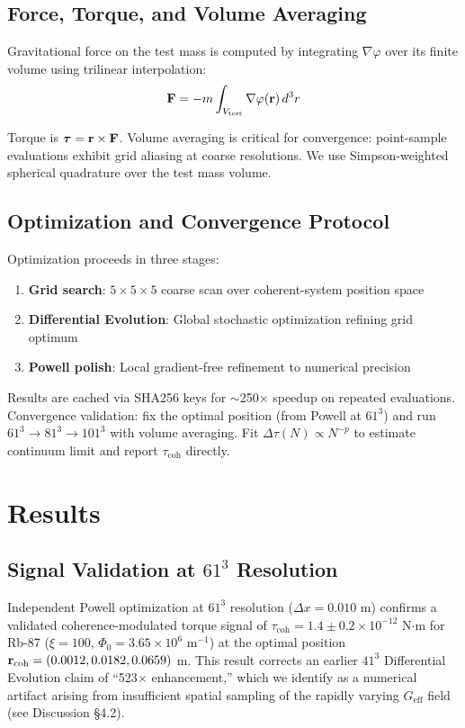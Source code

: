 \documentclass[10pt,twocolumn]{article}
\begin{document}
\subsection{Force, Torque, and Volume Averaging}

Gravitational force on the test mass is computed by integrating $\nabla\varphi$ over its finite volume using trilinear interpolation:
\begin{equation}
{\bf F} = -m \int_{V_{\text{test}}} \nabla\varphi({\bf r}) \, d^3r
\end{equation}

Torque is $\boldsymbol{\tau} = {\bf r} \times {\bf F}$. Volume averaging is critical for convergence: point-sample evaluations exhibit grid aliasing at coarse resolutions. We use Simpson-weighted spherical quadrature over the test mass volume.

\subsection{Optimization and Convergence Protocol}

Optimization proceeds in three stages:
\begin{enumerate}
\item \textbf{Grid search}: $5 \times 5 \times 5$ coarse scan over coherent-system position space
\item \textbf{Differential Evolution}: Global stochastic optimization refining grid optimum
\item \textbf{Powell polish}: Local gradient-free refinement to numerical precision
\end{enumerate}

Results are cached via SHA256 keys for $\sim$250$\times$ speedup on repeated evaluations. Convergence validation: fix the optimal position (from Powell at $61^3$) and run $61^3 \rightarrow 81^3 \rightarrow 101^3$ with volume averaging. Fit $\Delta\tau(N) \propto N^{-p}$ to estimate continuum limit and report $\tau_{\text{coh}}$ directly.

\section{Results}

\subsection{Signal Validation at $61^3$ Resolution}

Independent Powell optimization at $61^3$ resolution ($\Delta x = 0.010$ m) confirms a validated coherence-modulated torque signal of $\tau_{\text{coh}} = 1.4 \pm 0.2 \times 10^{-12}$ N$\cdot$m for Rb-87 ($\xi = 100$, $\Phi_0 = 3.65 \times 10^6$ m$^{-1}$) at the optimal position ${\bf r}_{\text{coh}} = (0.0012, 0.0182, 0.0659)$ m. This result corrects an earlier $41^3$ Differential Evolution claim of ``523$\times$ enhancement,'' which we identify as a numerical artifact arising from insufficient spatial sampling of the rapidly varying $G_{\text{eff}}$ field (see Discussion \S4.2).
\end{document}

